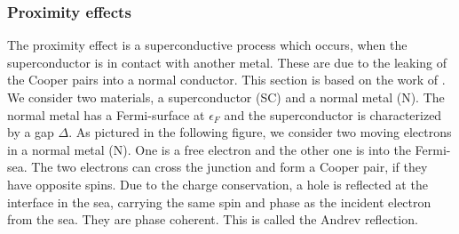 \documentclass[../main.tex]{subfile}
\begin{document}
\subsubsection{Proximity effects}
The proximity effect is a superconductive process which occurs, when the superconductor is in contact with another metal. These are due
to the leaking of the Cooper pairs into a normal conductor. This section is based on the work of \cite{Mjos2019}.\\

We consider two materials, a superconductor (SC) and a normal metal (N). The normal metal has a Fermi-surface at $\epsilon_F$ and the superconductor is characterized by a gap
$\Delta$.
As pictured in the following figure, we consider two moving electrons in a normal metal (N). One is a free electron and the other one is into the Fermi-sea.
The two electrons can cross the junction and form a Cooper pair, if they have opposite spins.
Due to the charge conservation, a hole is reflected at the interface in the sea, carrying the same spin and phase as the incident electron from the sea. They are phase coherent.
This is called the Andrev reflection.
\end{document}
